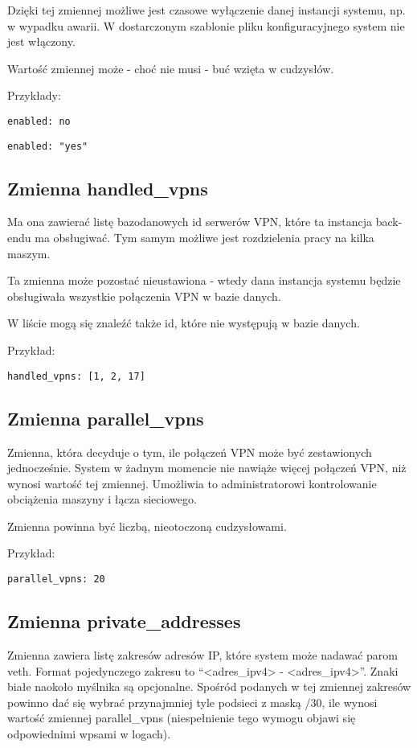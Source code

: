 \documentclass{hitec}
\begin{document}
\begin{sloppypar}
Dzięki tej zmiennej możliwe jest czasowe wyłączenie danej instancji systemu,
np. w wypadku awarii. W dostarczonym szablonie pliku konfiguracyjnego system
nie jest włączony.

Wartość zmiennej może - choć nie musi - buć wzięta w cudzysłów.

Przykłady:
\begin{verbatim}
enabled: no
\end{verbatim}
\begin{verbatim}
enabled: "yes"
\end{verbatim}

\subsection{Zmienna handled\_vpns}
Ma ona zawierać listę bazodanowych id serwerów VPN, które ta instancja back-endu
ma obsługiwać. Tym samym możliwe jest rozdzielenia pracy na kilka maszym.

Ta zmienna może pozostać nieustawiona - wtedy dana instancja systemu będzie
obsługiwała wszystkie połączenia VPN w bazie danych.

W liście mogą się znaleźć także id, które nie występują w bazie danych.

Przykład:
\begin{verbatim}
handled_vpns: [1, 2, 17]
\end{verbatim}

\subsection{Zmienna parallel\_vpns}
Zmienna, która decyduje o tym, ile połączeń VPN może być zestawionych
jednocześnie. System w żadnym momencie nie nawiąże więcej połączeń VPN, niż
wynosi wartość tej zmiennej. Umożliwia to administratorowi kontrolowanie
obciążenia maszyny i łącza sieciowego.

Zmienna powinna być liczbą, nieotoczoną cudzysłowami.

Przykład:
\begin{verbatim}
parallel_vpns: 20
\end{verbatim}

\subsection{Zmienna private\_addresses}
Zmienna zawiera listę zakresów adresów IP, które system może nadawać parom
veth. Format pojedynczego zakresu to
``{\textless}adres\_ipv4{\textgreater} - {\textless}adres\_ipv4{\textgreater}''.
Znaki białe naokoło myślnika są
opcjonalne. Spośród podanych w tej zmiennej zakresów powinno dać się wybrać
przynajmniej tyle podsieci z maską /30, ile wynosi wartość zmiennej
parallel\_vpns (niespełnienie tego wymogu objawi się odpowiednimi
wpsami w logach).


\end{sloppypar}
\end{document}
